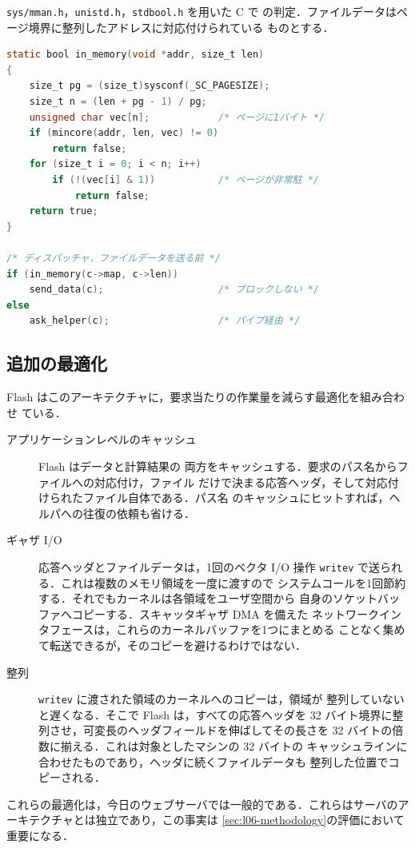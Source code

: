 \documentclass[../main.tex]{subfiles}
\begin{document}
\begin{example}
  \texttt{sys/mman.h}，\texttt{unistd.h}，\texttt{stdbool.h} を用いた C で
  の判定．ファイルデータはページ境界に整列したアドレスに対応付けられている
  ものとする．
  \begin{lstlisting}[language=C, numbers=none]
static bool in_memory(void *addr, size_t len)
{
    size_t pg = (size_t)sysconf(_SC_PAGESIZE);
    size_t n = (len + pg - 1) / pg;
    unsigned char vec[n];            /* ページに1バイト */
    if (mincore(addr, len, vec) != 0)
        return false;
    for (size_t i = 0; i < n; i++)
        if (!(vec[i] & 1))           /* ページが非常駐 */
            return false;
    return true;
}

/* ディスパッチャ，ファイルデータを送る前 */
if (in_memory(c->map, c->len))
    send_data(c);                    /* ブロックしない */
else
    ask_helper(c);                   /* パイプ経由 */
\end{lstlisting}
\end{example}

\subsection{追加の最適化}

Flash はこのアーキテクチャに，要求当たりの作業量を減らす最適化を組み合わせ
ている．
\begin{description}
  \item[アプリケーションレベルのキャッシュ] Flash はデータと計算結果の
    両方をキャッシュする．要求のパス名からファイルへの対応付け，ファイル
    だけで決まる応答ヘッダ，そして対応付けられたファイル自体である．パス名
    のキャッシュにヒットすれば，ヘルパへの往復の依頼も省ける．
  \item[ギャザ I/O] 応答ヘッダとファイルデータは，1回のベクタ I/O 操作
    \texttt{writev} で送られる．これは複数のメモリ領域を一度に渡すので
    システムコールを1回節約する．それでもカーネルは各領域をユーザ空間から
    自身のソケットバッファへコピーする．スキャッタギャザ DMA を備えた
    ネットワークインタフェースは，これらのカーネルバッファを1つにまとめる
    ことなく集めて転送できるが，そのコピーを避けるわけではない．%
  \item[整列] \texttt{writev} に渡された領域のカーネルへのコピーは，領域が
    整列していないと遅くなる．そこで Flash は，すべての応答ヘッダを
    32 バイト境界に整列させ，可変長のヘッダフィールドを伸ばしてその長さを
    32 バイトの倍数に揃える．これは対象としたマシンの 32 バイトの
    キャッシュラインに合わせたものであり，ヘッダに続くファイルデータも
    整列した位置でコピーされる．
\end{description}
これらの最適化は，今日のウェブサーバでは一般的である．これらはサーバのアーキテクチャとは独立であり，この事実は
\cref{sec:l06-methodology}の評価において重要になる．
\end{document}
